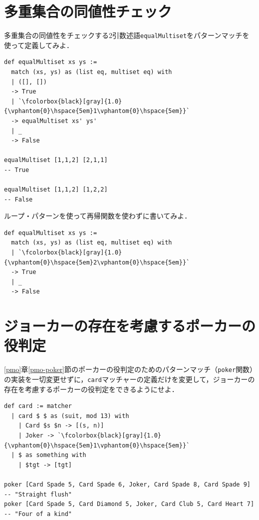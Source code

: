 \section*{多重集合の同値性チェック}

多重集合の同値性をチェックする2引数述語\lstinline{equalMultiset}をパターンマッチを使って定義してみよ．

\begin{lstlisting}[language=egison]
def equalMultiset xs ys :=
  match (xs, ys) as (list eq, multiset eq) with
  | ([], [])
  -> True
  | `\fcolorbox{black}[gray]{1.0}{\vphantom{0}\hspace{5em}1\vphantom{0}\hspace{5em}}`
  -> equalMultiset xs' ys'
  | _
  -> False

equalMultiset [1,1,2] [2,1,1]
-- True

equalMultiset [1,1,2] [1,2,2]
-- False
\end{lstlisting}

ループ・パターンを使って再帰関数を使わずに書いてみよ．

\begin{lstlisting}[language=egison]
def equalMultiset xs ys :=
  match (xs, ys) as (list eq, multiset eq) with
  | `\fcolorbox{black}[gray]{1.0}{\vphantom{0}\hspace{5em}2\vphantom{0}\hspace{5em}}`
  -> True
  | _
  -> False
\end{lstlisting}

\section*{ジョーカーの存在を考慮するポーカーの役判定}

\ref{pmo}章\ref{pmo-poker}節のポーカーの役判定のためのパターンマッチ（\lstinline{poker}関数）の実装を一切変更せずに，\lstinline{card}マッチャーの定義だけを変更して，ジョーカーの存在を考慮するポーカーの役判定をできるようにせよ．
\begin{lstlisting}[language=egison]
def card := matcher
  | card $ $ as (suit, mod 13) with 
    | Card $s $n -> [(s, n)]
    | Joker -> `\fcolorbox{black}[gray]{1.0}{\vphantom{0}\hspace{5em}1\vphantom{0}\hspace{5em}}`
  | $ as something with
    | $tgt -> [tgt]

poker [Card Spade 5, Card Spade 6, Joker, Card Spade 8, Card Spade 9]
-- "Straight flush"
poker [Card Spade 5, Card Diamond 5, Joker, Card Club 5, Card Heart 7]
-- "Four of a kind"
\end{lstlisting}
